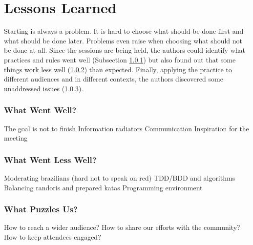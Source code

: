 \section{Lessons Learned}\label{sec:lessons_learned}

Starting is always a problem. It is hard to choose what should be done
first and what should be done later. Problems even raise when choosing
what should not be done at all. Since the sessions are being held, the
authors could identify what practices and rules went well (Subsection
\ref{ssub:well}) but also found out that some things work less well
(\ref{ssub:less_well}) than expected. Finally, applying the practice
to different audiences and in different contexts, the authors
discovered some unaddressed issues (\ref{ssub:puzzles}).

\subsubsection{What Went Well?}\label{ssub:well}

The goal is not to finish
Information radiators
Communication
Inspiration for the meeting

\subsubsection{What Went Less Well?}\label{ssub:less_well}
Moderating brazilians (hard not to speak on red)
TDD/BDD and algorithms
Balancing randoris and prepared katas
Programming environment

\subsubsection{What Puzzles Us?}\label{ssub:puzzles}
How to reach a wider audience?
How to share our efforts with the community?
How to keep attendees engaged?